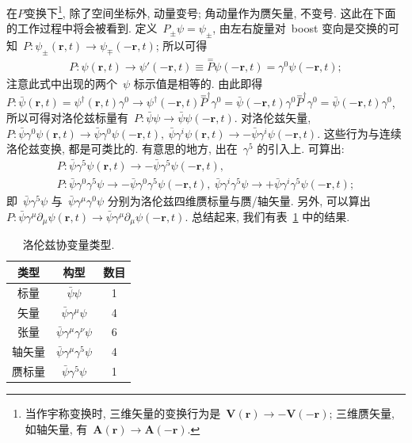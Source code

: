 在$P$变换下\footnote{当作宇称变换时, 三维矢量的变换行为是~$\bm{V}(\bm{r})\rightarrow-\bm{V}(-\bm{r})$; 三维赝矢量, 如轴矢量, 有~$\bm{A}(\bm{r})\rightarrow\bm{A}(-\bm{r})$.}, 除了空间坐标外, 动量变号; 角动量作为赝矢量, 不变号. 这此在下面的工作过程中将会被看到. 定义~$P_{\pm}\psi=\psi_\pm$, 由左右旋量对~boost 变向是交换的可知~$P: \psi_\pm(\bm{r},t)\rightarrow\psi_\mp(-\bm{r},t)$; 所以可得
\begin{align}
P: \psi(\bm{r},t)\rightarrow\psi'(-\bm{r},t)\equiv\overset{=}{P}\psi(-\bm{r},t)=\gamma^0\psi(-\bm{r},t);
\end{align}
注意此式中出现的两个~$\psi$ 标示值是相等的. %
由此即得~$P:\bar{\psi}(\bm{r},t)=\psi^\dag(\bm{r},t)\gamma^0\rightarrow\psi^\dag(-\bm{r},t)\overset{=}{P}^\dag\gamma^0=\bar{\psi}(-\bm{r},t)\gamma^0\overset{=}{P}^\dag\gamma^0=\bar{\psi}(-\bm{r},t)\gamma^0$,~ 所以可得对洛伦兹标量有~$P: \bar{\psi}\psi\rightarrow\bar{\psi}\psi(-\bm{r},t)$. 对洛伦兹矢量, $P:\bar{\psi}\gamma^0\psi(\bm{r},t)\rightarrow\bar{\psi}\gamma^0\psi(-\bm{r},t),~\bar{\psi}\gamma^i\psi(\bm{r},t)\rightarrow-\bar{\psi}\gamma^i\psi(-\bm{r},t)$. 这些行为与连续洛伦兹变换, 都是可类比的. 有意思的地方, 出在~$\gamma^5$ 的引入上. 可算出:
\begin{gather}
P:\bar{\psi}\gamma^5\psi(\bm{r},t)\rightarrow-\bar{\psi}\gamma^5\psi(-\bm{r},t),\\
P:\bar{\psi}\gamma^0\gamma^5\psi\rightarrow-\bar{\psi}\gamma^0\gamma^5\psi(-\bm{r},t),~\bar{\psi}\gamma^i\gamma^5\psi\rightarrow+\bar{\psi}\gamma^i\gamma^5\psi(-\bm{r},t);
\end{gather}
即~$\bar{\psi}\gamma^5\psi$ 与~$\bar{\psi}\gamma^\mu\gamma^0\psi$ 分别为洛伦兹四维赝标量与赝/轴矢量. 另外, 可以算出~$P:\bar{\psi}\gamma^\mu\partial_\mu\psi(\bm{r},t)\rightarrow\bar{\psi}\gamma^\mu\partial_\mu\psi(-\bm{r},t)$. 总结起来, 我们有表~\ref{biao1} 中的结果.
\begin{table}[!h]
\begin{center}
\begin{tabular}{c|c|c}
  类型 & 构型 & 数目 \\
  \hline
  标量 & $\bar{\psi}\psi$ & 1 \\
  矢量 & $\bar{\psi}\gamma^\mu\psi$ & 4 \\
  张量&$\bar{\psi}\gamma^\mu\gamma^\nu\psi$&6\\
  轴矢量&$\bar{\psi}\gamma^\mu\gamma^5\psi$&4\\
  赝标量&$\bar{\psi}\gamma^5\psi$&1
\end{tabular}
\caption{洛伦兹协变量类型.}\label{biao1}
\end{center}
\end{table}

